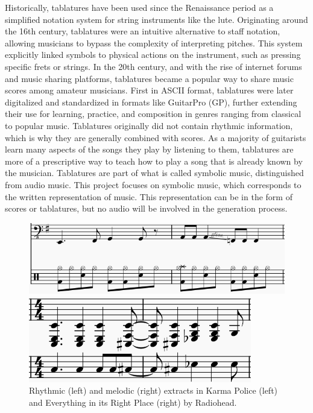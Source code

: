 Historically, tablatures have been used since the Renaissance period as a simplified notation system for string instruments like the lute.
Originating around the 16th century, tablatures were an intuitive alternative to staff notation, allowing musicians to bypass the complexity of interpreting pitches.
This system explicitly linked symbols to physical actions on the instrument, such as pressing specific frets or strings.
In the 20th century, and with the rise of internet forums and music sharing platforms, tablatures became a popular way to share music scores among amateur musicians.
First in ASCII format, tablatures were later digitalized and standardized in formats like GuitarPro (GP), further extending their use for learning, practice, and composition in genres ranging from classical to popular music\cite{sarmento_dadagp_2021}.
Tablatures originally did not contain rhythmic information, which is why they are generally combined with scores.
As a majority of guitarists learn many aspects of the songs they play by listening to them\cite{green_how_2001},
tablatures are more of a prescriptive way to teach how to play a song that is already known by the musician.
Tablatures are part of what is called symbolic music, distinguished from audio music.
This project focuses on symbolic music, which corresponds to the written representation of music.
This representation can be in the form of scores or tablatures, but no audio will be involved in the generation process.


\begin{figure}[!ht]
    \centering
    \begin{minipage}{0.45\textwidth}
        \centering
        \includegraphics[width=.99\linewidth]{../images-figures/rhythmic_tab_karma_police.png}
    \end{minipage}%
    \hfill
    \begin{minipage}{0.45\textwidth}
        \centering
        \includegraphics[width=.7\linewidth]{../images-figures/melodic_tab_eiirp.png}
    \end{minipage}
    \caption{Rhythmic (left) and melodic (right) extracts in Karma Police (left) and Everything in its Right Place (right) by Radiohead.}
    \label{fig:bass_tab_TIRO}
\end{figure}


